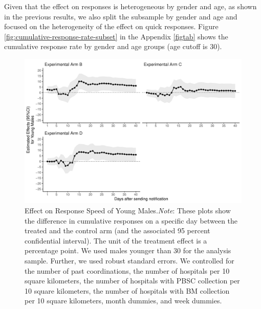 \documentclass [12pt, a4paper]{article}
\begin{document}
Given that the effect on responses is heterogeneous by gender and age, as shown in the previous results, we also split the subsample by gender and age and focused on the heterogeneity of the effect on quick responses. Figure \ref{fig:cumulative-response-rate-subset} in the Appendix \ref{figtab} shows the cumulative response rate by gender and age groups (age cutoff is 30).

\begin{figure}[t]
\includegraphics{JMDP RCT - Main Document_files/figure-latex/young-male-flow-1} \caption{Effect on Response Speed of Young Males.\newline \emph{Note}: These plots show the difference in cumulative responses on a specific day between the treated and the control arm (and the associated 95 percent confidential interval). The unit of the treatment effect is a percentage point. We used males younger than 30 for the analysis sample. Further, we used robust standard errors. We controlled for the number of past coordinations, the number of hospitals per 10 square kilometers, the number of hospitals with PBSC collection per 10 square kilometers, the number of hospitals with BM collection per 10 square kilometers, month dummies, and week dummies.}\label{fig:young-male-flow}
\end{figure}
\end{document}
